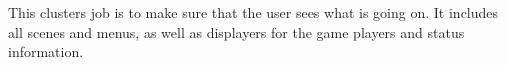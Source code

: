  This clusters job is to make sure that the user sees what is going on. It includes all scenes and menus, as well as displayers for the game players and status information.
